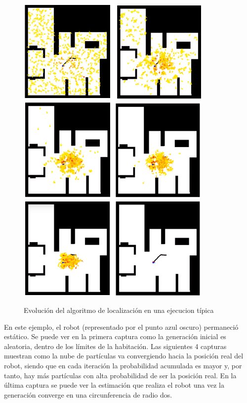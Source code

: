 \begin{figure}[H]
	\begin{center}
		\includegraphics[width=0.850\textwidth]{figures/lloutput1.png}
		\includegraphics[width=0.850\textwidth]{figures/lloutput2.png}
		\includegraphics[width=0.850\textwidth]{figures/lloutput3.png}
		\caption{Evolución del algoritmo de localización en una ejecucion típica}
		\label{fig.outputll}
		\end{center}
\end{figure}

En este ejemplo, el robot (representado por el punto azul oscuro) permaneció estático. Se puede ver en la primera captura como la generación inicial es aleatoria, dentro de los límites de la habitación. Las siguientes 4 capturas muestran como la nube de partículas va convergiendo hacia la posición real del robot, siendo que en cada iteración la probabilidad acumulada es mayor y, por tanto, hay más partículas con alta probabilidad de ser la posición real. En la última captura se puede ver la estimación que realiza el robot una vez la generación converge en una circunferencia de radio dos.

